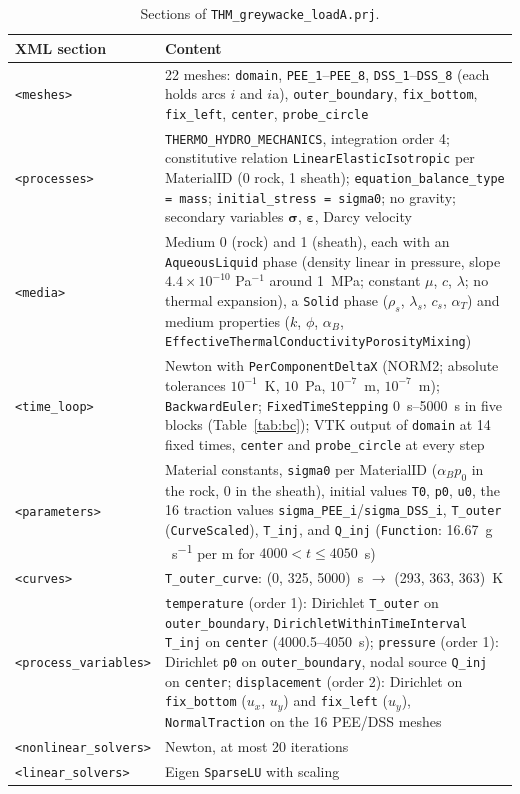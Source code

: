 \documentclass[11pt,a4paper]{article}
\begin{document}
\begin{table}[htbp]
\centering
\caption{Sections of \texttt{THM\_greywacke\_loadA.prj}.}
\label{tab:prj}
\begin{tabularx}{\textwidth}{@{}lL@{}}
\toprule
XML section & Content \\
\midrule
\texttt{<meshes>} & 22 meshes: \texttt{domain}, \texttt{PEE\_1}--\texttt{PEE\_8}, \texttt{DSS\_1}--\texttt{DSS\_8} (each holds arcs $i$ and $i$a), \texttt{outer\_boundary}, \texttt{fix\_bottom}, \texttt{fix\_left}, \texttt{center}, \texttt{probe\_circle} \\
\texttt{<processes>} & \texttt{THERMO\_HYDRO\_MECHANICS}, integration order 4; constitutive relation \texttt{LinearElasticIsotropic} per MaterialID (0 rock, 1 sheath); \texttt{equation\_balance\_type = mass}; \texttt{initial\_stress = sigma0}; no gravity; secondary variables $\bm{\sigma}$, $\bm{\varepsilon}$, Darcy velocity \\
\texttt{<media>} & Medium 0 (rock) and 1 (sheath), each with an \texttt{AqueousLiquid} phase (density linear in pressure, slope $4.4\times10^{-10}$ Pa$^{-1}$ around 1~MPa; constant $\mu$, $c$, $\lambda$; no thermal expansion), a \texttt{Solid} phase ($\rho_s$, $\lambda_s$, $c_s$, $\alpha_T$) and medium properties ($k$, $\phi$, $\alpha_B$, \texttt{EffectiveThermalConductivityPorosityMixing}) \\
\texttt{<time\_loop>} & Newton with \texttt{PerComponentDeltaX} (NORM2; absolute tolerances $10^{-1}$~K, $10$~Pa, $10^{-7}$~m, $10^{-7}$~m); \texttt{BackwardEuler}; \texttt{FixedTimeStepping} \SIrange{0}{5000}{s} in five blocks (Table~\ref{tab:bc}); VTK output of \texttt{domain} at 14 fixed times, \texttt{center} and \texttt{probe\_circle} at every step \\
\texttt{<parameters>} & Material constants, \texttt{sigma0} per MaterialID ($\alpha_B p_0$ in the rock, 0 in the sheath), initial values \texttt{T0}, \texttt{p0}, \texttt{u0}, the 16 traction values \texttt{sigma\_PEE\_i}/\texttt{sigma\_DSS\_i}, \texttt{T\_outer} (\texttt{CurveScaled}), \texttt{T\_inj}, and \texttt{Q\_inj} (\texttt{Function}: \SI{16.67}{g\,s^{-1}} per m for $4000 < t \le 4050$~s) \\
\texttt{<curves>} & \texttt{T\_outer\_curve}: (0, 325, 5000)~s $\rightarrow$ (293, 363, 363)~K \\
\texttt{<process\_variables>} & \texttt{temperature} (order 1): Dirichlet \texttt{T\_outer} on \texttt{outer\_boundary}, \texttt{DirichletWithinTimeInterval} \texttt{T\_inj} on \texttt{center} (4000.5--4050~s); \texttt{pressure} (order 1): Dirichlet \texttt{p0} on \texttt{outer\_boundary}, nodal source \texttt{Q\_inj} on \texttt{center}; \texttt{displacement} (order 2): Dirichlet on \texttt{fix\_bottom} ($u_x$, $u_y$) and \texttt{fix\_left} ($u_y$), \texttt{NormalTraction} on the 16 PEE/DSS meshes \\
\texttt{<nonlinear\_solvers>} & Newton, at most 20 iterations \\
\texttt{<linear\_solvers>} & Eigen \texttt{SparseLU} with scaling \\
\bottomrule
\end{tabularx}
\end{table}
\end{document}
